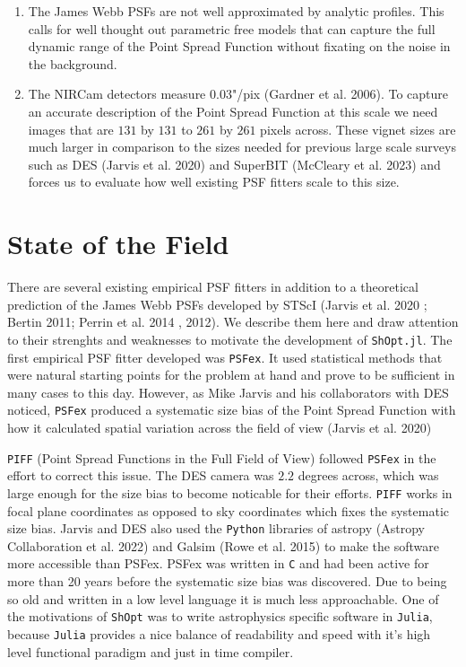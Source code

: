 \documentclass[
]{article}
\begin{document}
\begin{enumerate}
\def\labelenumi{(\arabic{enumi})}
\item
  The James Webb PSFs are not well approximated by analytic profiles.
  This calls for well thought out parametric free models that can
  capture the full dynamic range of the Point Spread Function without
  fixating on the noise in the background.
\item
  The NIRCam detectors measure 0.03"/pix (Gardner et al. 2006). To
  capture an accurate description of the Point Spread Function at this
  scale we need images that are \(131\) by \(131\) to \(261\) by \(261\)
  pixels across. These vignet sizes are much larger in comparison to the
  sizes needed for previous large scale surveys such as DES (Jarvis et
  al. 2020) and SuperBIT (McCleary et al. 2023) and forces us to
  evaluate how well existing PSF fitters scale to this size.
\end{enumerate}

\hypertarget{state-of-the-field}{%
\section{State of the Field}\label{state-of-the-field}}

There are several existing empirical PSF fitters in addition to a
theoretical prediction of the James Webb PSFs developed by STScI (Jarvis
et al. 2020 ; Bertin 2011; Perrin et al. 2014 , 2012). We describe them
here and draw attention to their strenghts and weaknesses to motivate
the development of \texttt{ShOpt.jl}. The first empirical PSF fitter
developed was \texttt{PSFex}. It used statistical methods that were
natural starting points for the problem at hand and prove to be
sufficient in many cases to this day. However, as Mike Jarvis and his
collaborators with DES noticed, \texttt{PSFex} produced a systematic
size bias of the Point Spread Function with how it calculated spatial
variation across the field of view (Jarvis et al. 2020)

\texttt{PIFF} (Point Spread Functions in the Full Field of View)
followed \texttt{PSFex} in the effort to correct this issue. The DES
camera was \(2.2\) degrees across, which was large enough for the size
bias to become noticable for their efforts. \texttt{PIFF} works in focal
plane coordinates as opposed to sky coordinates which fixes the
systematic size bias. Jarvis and DES also used the \texttt{Python}
libraries of astropy (Astropy Collaboration et al. 2022) and Galsim
(Rowe et al. 2015) to make the software more accessible than PSFex.
PSFex was written in \texttt{C} and had been active for more than 20
years before the systematic size bias was discovered. Due to being so
old and written in a low level language it is much less approachable.
One of the motivations of \texttt{ShOpt} was to write astrophysics
specific software in \texttt{Julia}, because \texttt{Julia} provides a
nice balance of readability and speed with it's high level functional
paradigm and just in time compiler.
\end{document}
